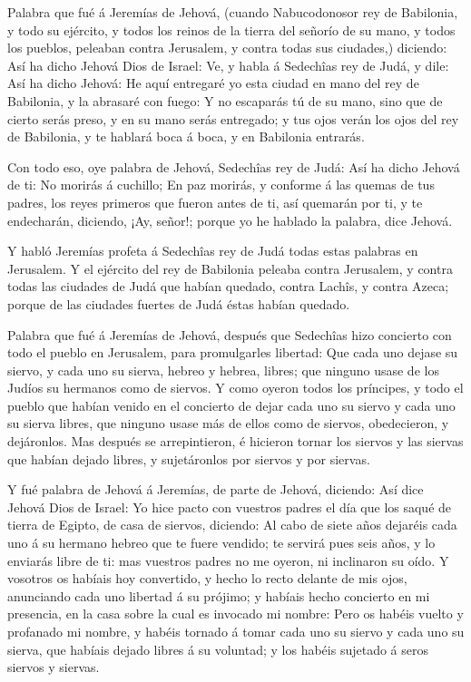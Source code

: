  Palabra que fué á Jeremías de Jehová, (cuando Nabucodonosor
rey de Babilonia, y todo su ejército, y todos los reinos de la tierra
del señorío de su mano, y todos los pueblos, peleaban contra Jerusalem,
y contra todas sus ciudades,) diciendo:  Así ha dicho Jehová
Dios de Israel: Ve, y habla á Sedechîas rey de Judá, y dile: Así ha
dicho Jehová: He aquí entregaré yo esta ciudad en mano del rey de
Babilonia, y la abrasaré con fuego:  Y no escaparás tú de su
mano, sino que de cierto serás preso, y en su mano serás entregado; y
tus ojos verán los ojos del rey de Babilonia, y te hablará boca á boca,
y en Babilonia entrarás.

 Con todo eso, oye palabra de Jehová, Sedechîas rey de Judá:
Así ha dicho Jehová de ti: No morirás á cuchillo;  En paz
morirás, y conforme á las quemas de tus padres, los reyes primeros que
fueron antes de ti, así quemarán por ti, y te endecharán, diciendo, ¡Ay,
señor!; porque yo he hablado la palabra, dice Jehová.

 Y habló Jeremías profeta á Sedechîas rey de Judá todas
estas palabras en Jerusalem.  Y el ejército del rey de
Babilonia peleaba contra Jerusalem, y contra todas las ciudades de Judá
que habían quedado, contra Lachîs, y contra Azeca; porque de las
ciudades fuertes de Judá éstas habían quedado.

 Palabra que fué á Jeremías de Jehová, después que Sedechîas
hizo concierto con todo el pueblo en Jerusalem, para promulgarles
libertad:  Que cada uno dejase su siervo, y cada uno su
sierva, hebreo y hebrea, libres; que ninguno usase de los Judíos su
hermanos como de siervos.  Y como oyeron todos los
príncipes, y todo el pueblo que habían venido en el concierto de dejar
cada uno su siervo y cada uno su sierva libres, que ninguno usase más de
ellos como de siervos, obedecieron, y dejáronlos.  Mas
después se arrepintieron, é hicieron tornar los siervos y las siervas
que habían dejado libres, y sujetáronlos por siervos y por siervas.

 Y fué palabra de Jehová á Jeremías, de parte de Jehová,
diciendo:  Así dice Jehová Dios de Israel: Yo hice pacto
con vuestros padres el día que los saqué de tierra de Egipto, de casa de
siervos, diciendo:  Al cabo de siete años dejaréis cada uno
á su hermano hebreo que te fuere vendido; te servirá pues seis años, y
lo enviarás libre de ti: mas vuestros padres no me oyeron, ni inclinaron
su oído.  Y vosotros os habíais hoy convertido, y hecho lo
recto delante de mis ojos, anunciando cada uno libertad á su prójimo; y
habíais hecho concierto en mi presencia, en la casa sobre la cual es
invocado mi nombre:  Pero os habéis vuelto y profanado mi
nombre, y habéis tornado á tomar cada uno su siervo y cada uno su
sierva, que habíais dejado libres á su voluntad; y los habéis sujetado á
seros siervos y siervas.

